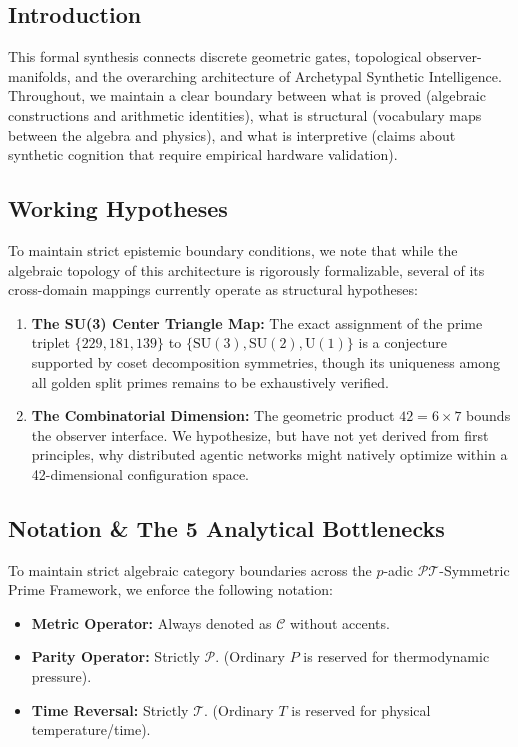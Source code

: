 \vspace{1em}

\subsection*{Introduction}
This formal synthesis connects discrete geometric gates, topological observer-manifolds, and the overarching architecture of Archetypal Synthetic Intelligence. Throughout, we maintain a clear boundary between what is proved (algebraic constructions and arithmetic identities), what is structural (vocabulary maps between the algebra and physics), and what is interpretive (claims about synthetic cognition that require empirical hardware validation).

\subsection*{Working Hypotheses}
To maintain strict epistemic boundary conditions, we note that while the algebraic topology of this architecture is rigorously formalizable, several of its cross-domain mappings currently operate as structural hypotheses:
\begin{enumerate}
    \item \textbf{The SU(3) Center Triangle Map:} The exact assignment of the prime triplet $\{229, 181, 139\}$ to $\{\text{SU}(3), \text{SU}(2), \text{U}(1)\}$ is a conjecture supported by coset decomposition symmetries, though its uniqueness among all golden split primes remains to be exhaustively verified.
    \item \textbf{The Combinatorial Dimension:} The geometric product $42 = 6 \times 7$ bounds the observer interface. We hypothesize, but have not yet derived from first principles, why distributed agentic networks might natively optimize within a 42-dimensional configuration space.
\end{enumerate}

\subsection*{Notation \& The 5 Analytical Bottlenecks}
To maintain strict algebraic category boundaries across the $p$-adic $\mathcal{PT}$-Symmetric Prime Framework, we enforce the following notation:
\begin{itemize}
    \item \textbf{Metric Operator:} Always denoted as $\mathcal{C}$ without accents.
    \item \textbf{Parity Operator:} Strictly $\mathcal{P}$. (Ordinary $P$ is reserved for thermodynamic pressure).
    \item \textbf{Time Reversal:} Strictly $\mathcal{T}$. (Ordinary $T$ is reserved for physical temperature/time).
\end{itemize}

